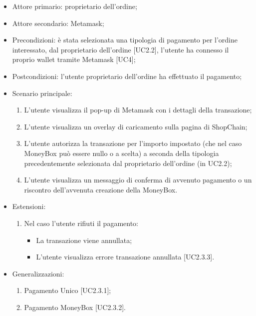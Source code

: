 \begin{itemize}
    \item Attore primario: proprietario dell'ordine;
    \item Attore secondario: Metamask\glo{};
    \item Precondizioni: è stata selezionata una tipologia di pagamento per l'ordine interessato, dal proprietario dell'ordine [UC2.2], 
            l'utente ha connesso il proprio wallet\glo{} tramite Metamask\glo{} [UC4];
    \item Postcondizioni: l'utente proprietario dell'ordine ha effettuato il pagamento;
    \item Scenario principale:
          \begin{enumerate}
              \item L'utente visualizza il pop-up di Metamask\glo{} con i dettagli della transazione;
              \item L'utente visualizza un overlay di caricamento sulla pagina di ShopChain;
              \item L'utente autorizza la transazione per l'importo impostato (che nel caso MoneyBox\glo{} può essere nullo o a scelta) a seconda della tipologia precedentemente selezionata dal proprietario dell'ordine (in UC2.2);
              \item L'utente visualizza un messaggio di conferma di avvenuto pagamento o un riscontro dell'avvenuta creazione della MoneyBox\glo{}.
          \end{enumerate}
    \item Estensioni:
          \begin{enumerate}
              \item Nel caso l'utente rifiuti il pagamento:
              \begin{itemize}
                  \item La transazione viene annullata;
                  \item L'utente visualizza errore transazione annullata [UC2.3.3].
              \end{itemize}
          \end{enumerate}
    \item Generalizzazioni:
          \begin{enumerate}
              \item Pagamento Unico [UC2.3.1];
              \item Pagamento MoneyBox\glo{} [UC2.3.2].
          \end{enumerate}
\end{itemize}

